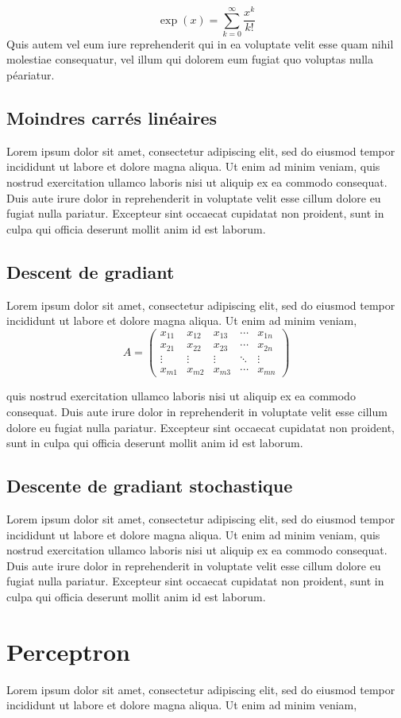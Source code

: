 		\[\exp(x)=\sum_{k=0}^{\infty}\frac{x^k}{k!}\]
		Quis autem vel eum iure reprehenderit qui in ea voluptate velit esse quam nihil molestiae consequatur, vel illum qui dolorem eum fugiat quo voluptas nulla péariatur.
			
	\subsection{Moindres carrés linéaires}
		Lorem ipsum dolor sit amet, consectetur adipiscing elit, sed do eiusmod tempor incididunt ut labore et dolore magna aliqua. Ut enim ad minim veniam, quis nostrud exercitation ullamco laboris nisi ut aliquip ex ea commodo consequat. Duis aute irure dolor in reprehenderit in voluptate velit esse cillum dolore eu fugiat nulla pariatur. Excepteur sint occaecat cupidatat non proident, sunt in culpa qui officia deserunt mollit anim id est laborum. %
		
			
		
	\subsection{Descent de gradiant}
		Lorem ipsum dolor sit amet, consectetur adipiscing elit, sed do eiusmod tempor incididunt ut labore et dolore magna aliqua. Ut enim ad minim veniam, \\ 
			
			$$A = \begin{pmatrix}
				x_{11} & x_{12} & x_{13} & \cdots & x_{1n} \\
				x_{21} & x_{22} & x_{23} & \cdots & x_{2n} \\
				\vdots & \vdots & \vdots & \ddots & \vdots \\
				x_{m1} & x_{m2} & x_{m3} & \cdots & x_{mn} 
			\end{pmatrix}$$
			
		
		quis nostrud exercitation ullamco laboris nisi ut aliquip ex ea commodo consequat. Duis aute irure dolor in reprehenderit in voluptate velit esse cillum dolore eu fugiat nulla pariatur. Excepteur sint occaecat cupidatat non proident, sunt in culpa qui officia deserunt mollit anim id est laborum.
		
	\subsection{Descente de gradiant stochastique}
		Lorem ipsum dolor sit amet, consectetur adipiscing elit, sed do eiusmod tempor incididunt ut labore et dolore magna aliqua. Ut enim ad minim veniam, quis nostrud exercitation ullamco laboris nisi ut aliquip ex ea commodo consequat. Duis aute irure dolor in reprehenderit in voluptate velit esse cillum dolore eu fugiat nulla pariatur. Excepteur sint occaecat cupidatat non proident, sunt in culpa qui officia deserunt mollit anim id est laborum.
	\section{Perceptron}
		Lorem ipsum dolor sit amet, consectetur adipiscing elit, sed do eiusmod tempor incididunt ut labore et dolore magna aliqua. Ut enim ad minim veniam,
		